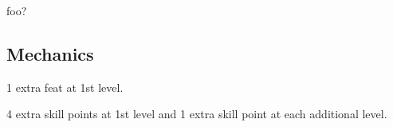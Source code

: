 
foo?

\subsection{Mechanics}

\begin{itemize*}
\item {}
\item {}
\item {}
\item {}
\item 1 extra feat at 1st level.
\item 4 extra skill points at 1st level and 1 extra skill point at each additional level.
\item {}
\item {}
\item {}
\end{itemize*}
